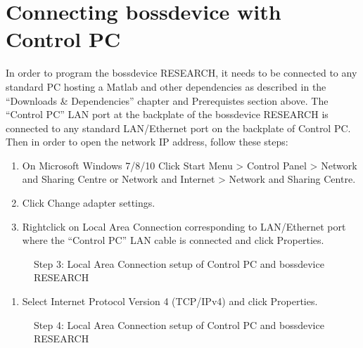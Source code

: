 \documentclass[letterpaper,10pt,english]{sphinxmanual}
\begin{document}
\section{Connecting bossdevice with Control PC}
\label{\detokenize{2_setup_bossdevice_research:connecting-bossdevice-with-control-pc}}
\sphinxAtStartPar
In order to program the bossdevice RESEARCH, it needs to be connected to any standard PC hosting a Matlab and other dependencies as described in the “Downloads \& Dependencies” chapter and Pre\sphinxhyphen{}requistes section above. The “Control PC” LAN port at the backplate of the bossdevice RESEARCH is connected to any standard LAN/Ethernet port on the backplate of Control PC. Then in order to open the network IP address, follow these steps:
\begin{enumerate}
%
\item {} 
\sphinxAtStartPar
On Microsoft Windows 7/8/10 Click Start Menu \textgreater{} Control Panel \textgreater{} Network and Sharing Centre or Network and Internet \textgreater{} Network and Sharing Centre.

\item {} 
\sphinxAtStartPar
Click Change adapter settings.

\item {} 
\sphinxAtStartPar
Right\sphinxhyphen{}click on Local Area Connection corresponding to LAN/Ethernet port where the “Control PC” LAN cable is connected and click Properties.

\end{enumerate}

\begin{figure}[htbp]
\centering
\capstart

\noindent{}
\caption{Step 3: Local Area Connection setup of Control PC and bossdevice RESEARCH}\label{\detokenize{2_setup_bossdevice_research:id1}}\end{figure}
\begin{enumerate}
%
\setcounter{enumi}{3}
\item {} 
\sphinxAtStartPar
Select Internet Protocol Version 4 (TCP/IPv4) and click Properties.

\end{enumerate}

\begin{figure}[htbp]
\centering
\capstart

\noindent{}
\caption{Step 4: Local Area Connection setup of Control PC and bossdevice RESEARCH}\label{\detokenize{2_setup_bossdevice_research:id2}}\end{figure}
\end{document}
